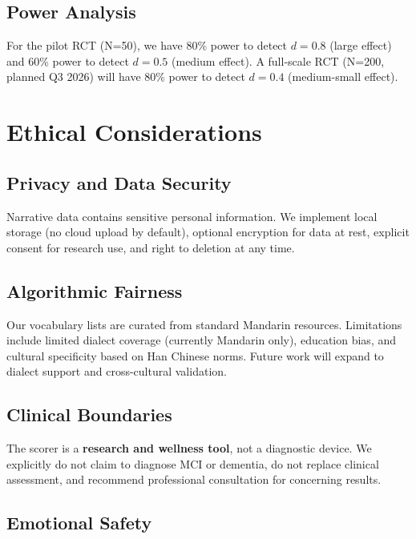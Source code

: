 \documentclass[11pt]{article}
\begin{document}
\subsection{Power Analysis}

For the pilot RCT (N=50), we have 80\% power to detect $d = 0.8$ (large effect) and 60\% power to detect $d = 0.5$ (medium effect). A full-scale RCT (N=200, planned Q3 2026) will have 80\% power to detect $d = 0.4$ (medium-small effect).


\section{Ethical Considerations}\label{sec:ethics}

\subsection{Privacy and Data Security}

Narrative data contains sensitive personal information. We implement local storage (no cloud upload by default), optional encryption for data at rest, explicit consent for research use, and right to deletion at any time.

\subsection{Algorithmic Fairness}

Our vocabulary lists are curated from standard Mandarin resources. Limitations include limited dialect coverage (currently Mandarin only), education bias, and cultural specificity based on Han Chinese norms. Future work will expand to dialect support and cross-cultural validation.

\subsection{Clinical Boundaries}

The scorer is a \textbf{research and wellness tool}, not a diagnostic device. We explicitly do not claim to diagnose MCI or dementia, do not replace clinical assessment, and recommend professional consultation for concerning results.

\subsection{Emotional Safety}
\end{document}
